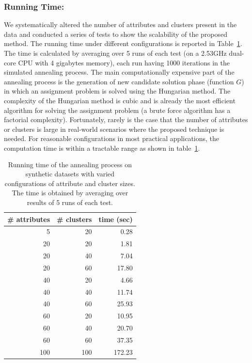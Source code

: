 \subsubsection{Running Time:}
We systematically altered the number of attributes and clusters present in the data and conducted a series of tests to show the scalability of the proposed method. The running time under different configurations is reported in Table~\ref{tbl:scale}. The time is calculated by averaging over 5 runs of each test (on a 2.53GHz dual-core CPU with 4 gigabytes memory), each run having 1000 iterations in the simulated annealing process. The main computationally expensive part of the annealing process is the generation of new candidate solution phase (function $G$) in which an assignment problem is solved using the Hungarian method. The complexity of the Hungarian method is cubic and is already the most efficient algorithm for solving the assignment problem (a brute force algorithm has a factorial complexity). Fortunately, rarely is the case that the number of attributes or clusters is large in real-world scenarios where the proposed technique is needed. For reasonable configurations in most practical applications, the computation time is within a tractable range as shown in table~\ref{tbl:scale}.
\begin{table}[tbh]
\begin{center}
\begin{tabular}{r|r|r}
\hline
\# attributes & \# clusters & time (sec)\\
\hline
5   &   20  &   0.28\\
20  &   20  &   1.81\\
20  &   40  &   7.04\\
20  &   60  &   17.80\\
40  &   20  &   4.66\\
40  &   40  &   11.74\\
40  &   60  &   25.93\\
60  &   20  &   10.95\\
60  &   40  &   20.70\\
60  &   60  &   37.35\\
100 &   100 &   172.23\\
\hline
\end{tabular}
\end{center}
\caption{\label{tbl:scale} Running time of the annealing process on synthetic datasets with varied configurations of attribute and cluster sizes. The time is obtained by averaging over results of 5 runs of each test.}
\end{table}

